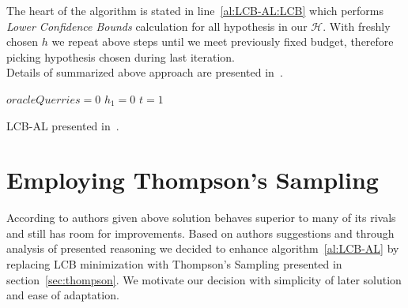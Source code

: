 \documentclass[12pt, a4paper, pdflatex]{report}
\begin{document}
The heart of the algorithm is stated in line~\ref{al:LCB-AL:LCB} which performs \emph{Lower Confidence Bounds} calculation for all hypothesis in our $\mathscr{H}$. With freshly chosen $h$ we repeat above steps until we meet previously fixed budget, therefore picking hypothesis chosen during last iteration.\\

Details of summarized above approach are presented in~\cite{DBLP:journals/corr/GantiG13}.\\

\vspace{2cm}
\begin{algorithm}[H]
 \LinesNumbered
 $oracleQuerries = 0$\;
 $h_1 = 0$\;
 $t = 1$\;
 \caption{LCB-AL presented in~\cite{DBLP:journals/corr/GantiG13}.\label{al:LCB-AL}}
\end{algorithm}
\vspace{2cm}


\section{Employing Thompson's Sampling}
According to authors given above solution behaves superior to many of its rivals and still has room for improvements. Based on authors suggestions and through analysis of presented reasoning we decided to enhance algorithm~\ref{al:LCB-AL} by replacing LCB minimization with Thompson's Sampling presented in section~\ref{sec:thompson}. We motivate our decision with simplicity of later solution and ease of adaptation.\\
\end{document}
